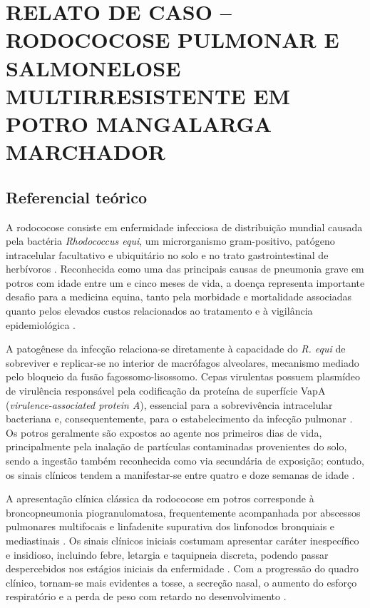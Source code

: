 \chapter{RELATO DE CASO -- RODOCOCOSE PULMONAR E SALMONELOSE MULTIRRESISTENTE EM POTRO MANGALARGA MARCHADOR}
\label{cap:relato-caso}

\section{Referencial teórico}
\label{sec:referencial}

A rodococose consiste em enfermidade infecciosa de distribuição mundial
causada pela bactéria \textit{Rhodococcus equi}, um microrganismo
gram-positivo, patógeno intracelular facultativo e ubiquitário no solo e
no trato gastrointestinal de herbívoros \cite{Giguere2011, Bordin2022}.
Reconhecida como uma das principais causas de pneumonia grave em
potros com idade entre um e cinco meses de vida, a doença representa
importante desafio para a medicina equina, tanto pela morbidade e
mortalidade associadas quanto pelos elevados custos relacionados ao
tratamento e à vigilância epidemiológica \cite{Cohen2014, Muscatello2012}.

A patogênese da infecção relaciona-se diretamente à capacidade do
\textit{R. equi} de sobreviver e replicar-se no interior de macrófagos
alveolares, mecanismo mediado pelo bloqueio da fusão
fagossomo-lisossomo. Cepas virulentas possuem plasmídeo de virulência
responsável pela codificação da proteína de superfície VapA
(\textit{virulence-associated protein A}), essencial para a sobrevivência
intracelular bacteriana e, consequentemente, para o estabelecimento da
infecção pulmonar \cite{Bordin2022, Lascola2024}. Os potros
geralmente são expostos ao agente nos primeiros dias de vida,
principalmente pela inalação de partículas contaminadas provenientes do
solo, sendo a ingestão também reconhecida como via secundária de
exposição; contudo, os sinais clínicos tendem a manifestar-se entre
quatro e doze semanas de idade \cite{Giguere2011}.

A apresentação clínica clássica da rodococose em potros corresponde à
broncopneumonia piogranulomatosa, frequentemente acompanhada por
abscessos pulmonares multifocais e linfadenite supurativa dos linfonodos
bronquiais e mediastinais \cite{Cohen2014}. Os sinais clínicos iniciais
costumam apresentar caráter inespecífico e insidioso, incluindo febre,
letargia e taquipneia discreta, podendo passar despercebidos nos
estágios iniciais da enfermidade \cite{Cohen2014, Giguere2011}. Com a
progressão do quadro clínico, tornam-se mais evidentes a tosse, a
secreção nasal, o aumento do esforço respiratório e a perda de peso com
retardo no desenvolvimento \cite{Lascola2024, Sanz2023}.

